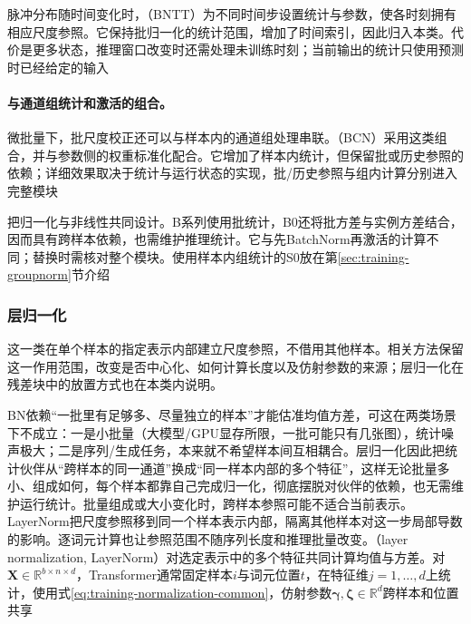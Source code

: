 脉冲分布随时间变化时，（BNTT）为不同时间步设置统计与参数，使各时刻拥有相应尺度参照。它保持批归一化的统计范围，增加了时间索引，因此归入本类。代价是更多状态，推理窗口改变时还需处理未训练时刻；当前输出的统计只使用预测时已经给定的输入

\paragraph{与通道组统计和激活的组合。}

微批量下，批尺度校正还可以与样本内的通道组处理串联。（BCN）采用这类组合，并与参数侧的权重标准化配合。它增加了样本内统计，但保留批或历史参照的依赖；详细效果取决于统计与运行状态的实现，批/历史参照与组内计算分别进入完整模块

把归一化与非线性共同设计。B系列使用批统计，B0还将批方差与实例方差结合，因而具有跨样本依赖，也需维护推理统计。它与先BatchNorm再激活的计算不同；替换时需核对整个模块。使用样本内组统计的S0放在第\ref{sec:training-groupnorm}节介绍

\subsubsection{层归一化}
\label{sec:training-layernorm-family}
\label{sec:training-layernorm}
\label{sec:training-rmsnorm}
\label{sec:training-scalenorm}
\label{sec:training-pixelnorm}
\label{sec:training-qknorm}
\label{sec:training-adaptive-layernorm}
\label{sec:training-normalization-block-designs}
\label{sec:training-normalization-placement}
\label{sec:training-other-normalization-designs}
这一类在单个样本的指定表示内部建立尺度参照，不借用其他样本。相关方法保留这一作用范围，改变是否中心化、如何计算长度以及仿射参数的来源；层归一化在残差块中的放置方式也在本类内说明。

BN依赖“一批里有足够多、尽量独立的样本”才能估准均值方差，可这在两类场景下不成立：一是小批量（大模型/GPU显存所限，一批可能只有几张图），统计噪声极大；二是序列/生成任务，本来就不希望样本间互相耦合。层归一化因此把统计伙伴从“跨样本的同一通道”换成“同一样本内部的多个特征”，这样无论批量多小、组成如何，每个样本都靠自己完成归一化，彻底摆脱对伙伴的依赖，也无需维护运行统计。批量组成或大小变化时，跨样本参照可能不适合当前表示。LayerNorm把尺度参照移到同一个样本表示内部，隔离其他样本对这一步局部导数的影响。逐词元计算也让参照范围不随序列长度和推理批量改变。（layer normalization, LayerNorm）对选定表示中的多个特征共同计算均值与方差。对$\bm X\in\mathbb R^{b\times n\times d}$，Transformer通常固定样本$i$与词元位置$t$，在特征维$j=1,\ldots,d$上统计，使用式\eqref{eq:training-normalization-common}，仿射参数$\bm\gamma,\bm\zeta\in\mathbb R^d$跨样本和位置共享

